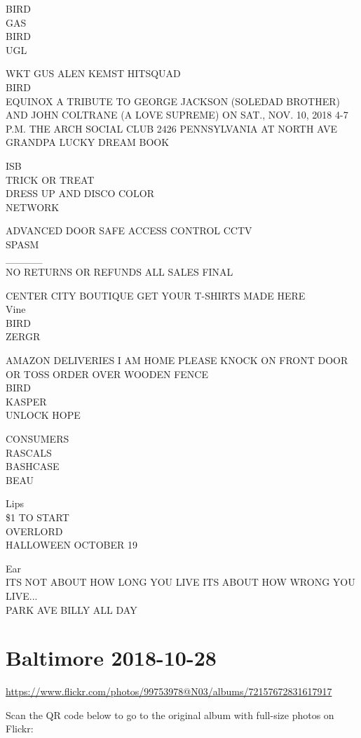 \documentclass[10pt,letterpaper]{article}
\begin{document}
BIRD\\
GAS\\
BIRD\\
UGL

WKT GUS ALEN KEMST HITSQUAD\\
BIRD\\
EQUINOX A TRIBUTE TO GEORGE JACKSON (SOLEDAD BROTHER) AND JOHN COLTRANE (A LOVE SUPREME) ON SAT., NOV. 10, 2018 4{-}7 P.M. THE ARCH SOCIAL CLUB 2426 PENNSYLVANIA AT NORTH AVE\\
GRANDPA LUCKY DREAM BOOK

ISB\\
TRICK OR TREAT\\
DRESS UP AND DISCO COLOR\\
NETWORK

ADVANCED DOOR SAFE ACCESS CONTROL CCTV\\
SPASM\\
\_\_\_\_\_\\
NO RETURNS OR REFUNDS ALL SALES FINAL

CENTER CITY BOUTIQUE GET YOUR T{-}SHIRTS MADE HERE\\
Vine\\
BIRD\\
ZERGR

AMAZON DELIVERIES I AM HOME PLEASE KNOCK ON FRONT DOOR OR TOSS ORDER OVER WOODEN FENCE\\
BIRD\\
KASPER\\
UNLOCK HOPE

CONSUMERS\\
RASCALS\\
BASHCASE\\
BEAU

Lips\\
\$1 TO START\\
OVERLORD\\
HALLOWEEN OCTOBER 19

Ear\\
ITS NOT ABOUT HOW LONG YOU LIVE ITS ABOUT HOW WRONG YOU LIVE...\\
PARK AVE BILLY ALL DAY


\section*{Baltimore 2018-10-28}

\url{https://www.flickr.com/photos/99753978@N03/albums/72157672831617917}

Scan the QR code below to go to the original album with full-size photos on Flickr:
\end{document}
